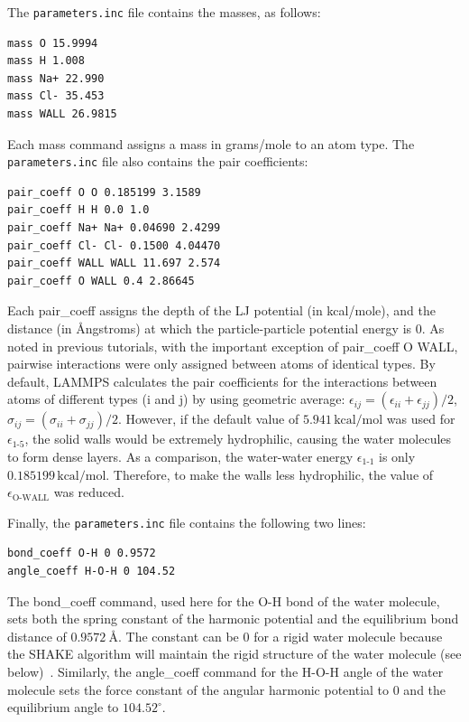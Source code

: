 \documentclass[9pt,tutorial]{livecoms}
\newcommand{\lmpcmd}[1]{\hspace{0pt}\colorbox{listing}{\textcolor{command}{\small{#1}}}\hspace{0pt}} %
\newcommand{\flecmd}[1]{\textcolor{command}{\texttt{#1}}} %
\begin{document}
The \flecmd{parameters.inc} file contains the masses, as follows:
\begin{lstlisting}
mass O 15.9994
mass H 1.008
mass Na+ 22.990
mass Cl- 35.453
mass WALL 26.9815
\end{lstlisting}
Each \lmpcmd{mass} command assigns a mass in grams/mole to an atom type.
The \flecmd{parameters.inc} file also contains the pair coefficients:
\begin{lstlisting}
pair_coeff O O 0.185199 3.1589
pair_coeff H H 0.0 1.0
pair_coeff Na+ Na+ 0.04690 2.4299
pair_coeff Cl- Cl- 0.1500 4.04470
pair_coeff WALL WALL 11.697 2.574
pair_coeff O WALL 0.4 2.86645
\end{lstlisting}
Each \lmpcmd{pair\_coeff} assigns the depth of the LJ potential
(in kcal/mole), and the distance (in Ångstroms) at which the particle-particle
potential energy is 0.  As noted in previous tutorials, with the important exception of
\lmpcmd{pair\_coeff O WALL}, pairwise interactions were only assigned between
atoms of identical types.  By default, LAMMPS calculates the pair coefficients for the
interactions between atoms of different types (i and j) by using geometric average:
$\epsilon_{ij} = (\epsilon_{ii} + \epsilon_{jj})/2$,  $\sigma_{ij} = (\sigma_{ii} + \sigma_{jj})/2$.
However, if the default value of $5.941\,\text{kcal/mol}$ was used for $\epsilon_\text{1-5}$, the solid
walls would be extremely hydrophilic, causing the water molecules to form dense layers.  As a
comparison, the water-water energy $\epsilon_\text{1-1}$ is only $0.185199\,\text{kcal/mol}$.
Therefore, to make the walls less hydrophilic, the value of $\epsilon_\text{O-WALL}$
was reduced.

Finally, the \flecmd{parameters.inc} file contains the following two lines:
\begin{lstlisting}
bond_coeff O-H 0 0.9572
angle_coeff H-O-H 0 104.52
\end{lstlisting}
The \lmpcmd{bond\_coeff} command, used here for the O-H bond of the water
molecule, sets both the spring constant of the harmonic potential and the
equilibrium bond distance of $0.9572~\text{\AA{}}$.  The constant can be 0 for a
rigid water molecule because the SHAKE algorithm will maintain the rigid
structure of the water molecule (see below)~\cite{ryckaert1977numerical, andersen1983rattle}.
Similarly, the \lmpcmd{angle\_coeff} command for the H-O-H angle of the water molecule sets
the force constant of the angular harmonic potential to 0 and the equilibrium
angle to $104.52^\circ$.
\end{document}
